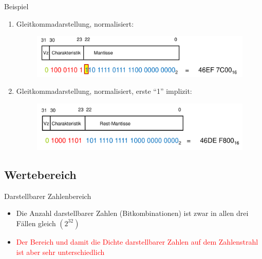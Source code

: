 \documentclass[12pt%
,aspectratio=169%
]{beamer}
\begin{document}
\begin{frame}{Beispiel}
	\begin{enumerate}\addtocounter{enumi}{1}
		\item Gleitkommadarstellung, normalisiert:
		\begin{figure}
			\includegraphics[scale=0.3]{pictures/norm}
		\end{figure}
		\item Gleitkommadarstellung, normalisiert, erste \enquote{1} implizit:
		\begin{figure}
			\includegraphics[scale=0.3]{pictures/norm_1}
		\end{figure}
	\end{enumerate}
\end{frame}

\subsection{Wertebereich}
\begin{frame}{Darstellbarer Zahlenbereich}
\begin{itemize}
	\item Die Anzahl darstellbarer Zahlen (Bitkombinationen) ist zwar in allen drei Fällen gleich $(2^{32})$
	\item \textcolor{red}{Der Bereich und damit die Dichte darstellbarer Zahlen auf dem Zahlenstrahl ist aber sehr unterschiedlich}
\end{itemize}
\end{frame}
\end{document}
